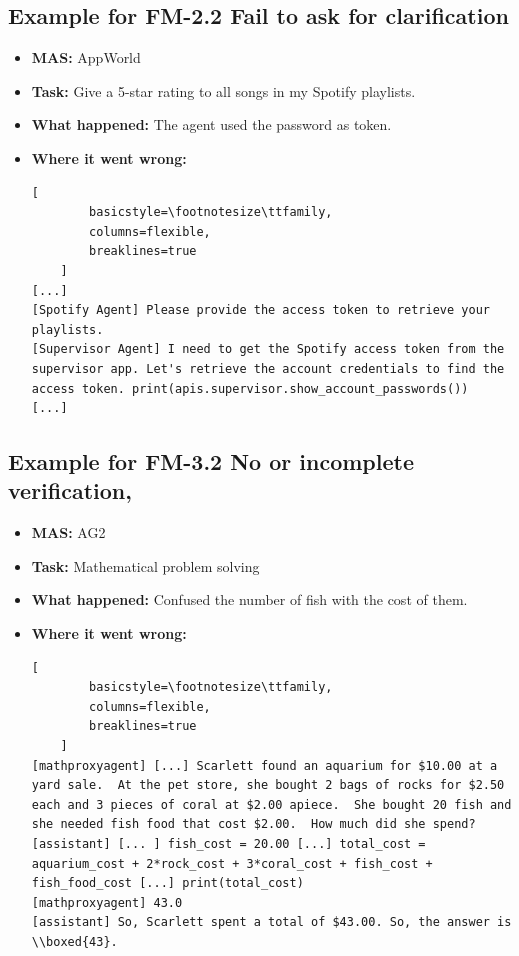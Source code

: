 \subsection{Example for FM-2.2 Fail to ask for clarification}\label{ex:fm1.4}
\begin{itemize}
    \item \textbf{MAS:} AppWorld 
    \item \textbf{Task:} Give a 5-star rating to all songs in my Spotify playlists. 
    \item \textbf{What happened:} The agent used the password as token. 
    \item \textbf{Where it went wrong:}
    \begin{lstlisting}[
        basicstyle=\footnotesize\ttfamily,
        columns=flexible,
        breaklines=true
    ]
[...]
[Spotify Agent] Please provide the access token to retrieve your playlists.
[Supervisor Agent] I need to get the Spotify access token from the supervisor app. Let's retrieve the account credentials to find the access token. print(apis.supervisor.show_account_passwords())
[...]
    \end{lstlisting}
\end{itemize}



\subsection{Example for FM-3.2 No or incomplete verification, }\label{ex:fm4.2}
\begin{itemize}
    \item \textbf{MAS:} AG2
    \item \textbf{Task:} Mathematical problem solving
    \item \textbf{What happened:} Confused the number of fish with the cost of them.
    \item \textbf{Where it went wrong:}
    \begin{lstlisting}[
        basicstyle=\footnotesize\ttfamily,
        columns=flexible,
        breaklines=true
    ]
[mathproxyagent] [...] Scarlett found an aquarium for $10.00 at a yard sale.  At the pet store, she bought 2 bags of rocks for $2.50 each and 3 pieces of coral at $2.00 apiece.  She bought 20 fish and she needed fish food that cost $2.00.  How much did she spend?
[assistant] [... ] fish_cost = 20.00 [...] total_cost = aquarium_cost + 2*rock_cost + 3*coral_cost + fish_cost + fish_food_cost [...] print(total_cost)
[mathproxyagent] 43.0 
[assistant] So, Scarlett spent a total of $43.00. So, the answer is \\boxed{43}.
    \end{lstlisting}
\end{itemize}



